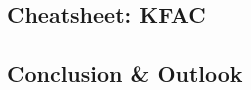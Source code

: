 \documentclass{article}
\begin{document}
\begin{paracol}{1}
  \section{Cheatsheet: KFAC}\label{sec:kfac-cheatsheet}
  
  \end{paracol}
\clearpage

\begin{paracol}{1}
  \section{Conclusion \& Outlook}\label{sec:outlook}
  
\end{paracol}
\clearpage



\appendix
\end{document}

